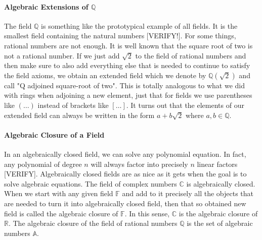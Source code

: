 


\paragraph{Algebraic Extensions of $\mathbb{Q}$}
The field $\mathbb{Q}$ is something like the prototypical example of all fields. It is the smallest field containing the natural numbers [VERIFY!]. For some things, rational numbers are not enough. It is well known that the square root of two is not a rational number. If we just add $\sqrt{2}$ to the field of rational numbers and then make sure to also add everything else that is needed to continue to satisfy the field axioms, we obtain an extended field which we denote by $\mathbb{Q}(\sqrt{2})$ and call "Q adjoined square-root of two". This is totally analogous to what we did with rings when adjoining a new element, just that for fields we use parentheses like $(\ldots)$ instead of brackets like $[\ldots]$. It turns out that the elements of our extended field can always be written in the form $a + b \sqrt{2}$ where $a,b \in \mathbb{Q}$.



\paragraph{Algebraic Closure of a Field}
In an algebraically closed field, we can solve any polynomial equation. In fact, any polynomial of degree $n$ will always factor into precisely $n$ linear factors [VERIFY]. Algebraically closed fields are as nice as it gets when the goal is to solve algebraic equations. The field of complex numbers $\mathbb{C}$ is algebraically closed. When we start with any given field $\mathbb{F}$ and add to it precisely all the objects that are needed to turn it into algebraically closed field, then that so obtained new field is called the algebraic closure of $\mathbb{F}$. In this sense, $\mathbb{C}$ is the algebraic closure of $\mathbb{R}$. The algebraic closure of the field of rational numbers $\mathbb{Q}$ is the set of algebraic numbers $\mathbb{A}$. 

